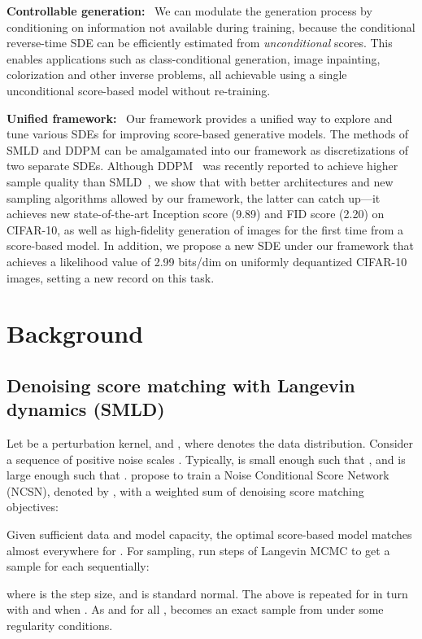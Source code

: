 \documentclass{article} \usepackage{iclr2021_conference,times}
\begin{document}
\textbf{Controllable generation:}~ We can modulate the generation process by conditioning on information not available during training, because the conditional reverse-time SDE can be efficiently estimated from \emph{unconditional} scores. This enables applications such as class-conditional generation, image inpainting, colorization and other inverse problems, all achievable using a single unconditional score-based model without re-training.


\textbf{Unified framework:}~ Our framework provides a unified way to explore and tune various SDEs for improving score-based generative models.
The methods of SMLD and DDPM can be amalgamated into our framework as discretizations of two separate SDEs. 
Although DDPM~\citep{ho2020denoising} was recently reported to achieve higher sample quality than SMLD~\citep{song2019generative,song2020improved}, we show that with better architectures and new sampling algorithms allowed by our framework, the latter can catch up---it achieves new state-of-the-art Inception score (9.89) and FID score (2.20) on CIFAR-10, as well as high-fidelity generation of  images for the first time from a score-based model. In addition, we propose a new SDE under our framework that achieves a likelihood value of 2.99 bits/dim on uniformly dequantized CIFAR-10 images, setting a new record on this task.

 \section{Background}
\subsection{Denoising score matching with Langevin dynamics (SMLD)}\label{sec:ncsn}
Let  be a perturbation kernel, and , where  denotes the data distribution. Consider a sequence of positive noise scales . Typically,  is small enough such that , and  is large enough such that . \citet{song2019generative} propose to train a Noise Conditional Score Network (NCSN), denoted by , with a weighted sum of denoising score matching~\citep{vincent2011connection} objectives:

Given sufficient data and model capacity, the optimal score-based model  matches  almost everywhere for . For sampling, \citet{song2019generative} run  steps of Langevin MCMC to get a sample for each  sequentially:

where  is the step size, and  is standard normal. The above is repeated for  in turn with  and  when . As  and  for all ,  becomes an exact sample from  under some regularity conditions.
\end{document}
